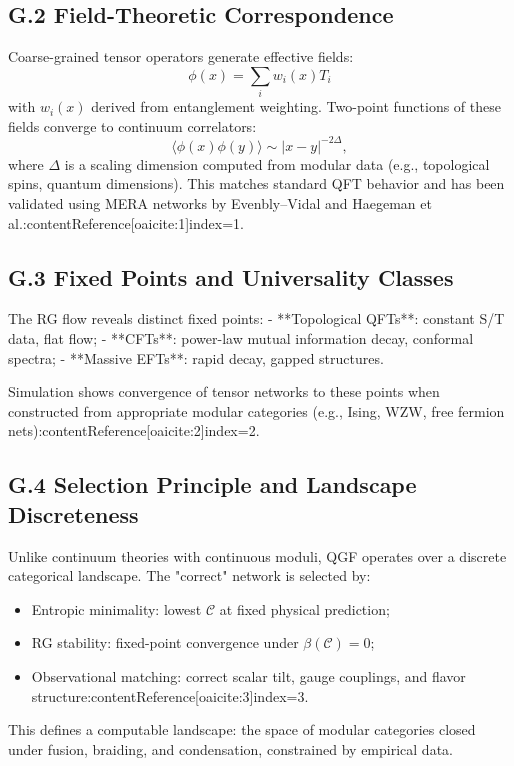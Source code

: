 \documentclass[11pt]{article}
\begin{document}
\subsection*{G.2 Field-Theoretic Correspondence}

Coarse-grained tensor operators generate effective fields:
\[
\phi(x) = \sum_i w_i(x) T_i
\]
with \( w_i(x) \) derived from entanglement weighting. Two-point functions of these fields converge to continuum correlators:
\[
\langle \phi(x) \phi(y) \rangle \sim |x - y|^{-2\Delta},
\]
where \( \Delta \) is a scaling dimension computed from modular data (e.g., topological spins, quantum dimensions). This matches standard QFT behavior and has been validated using MERA networks by Evenbly–Vidal and Haegeman et al.:contentReference[oaicite:1]{index=1}.

\subsection*{G.3 Fixed Points and Universality Classes}

The RG flow reveals distinct fixed points:
- **Topological QFTs**: constant S/T data, flat flow;
- **CFTs**: power-law mutual information decay, conformal spectra;
- **Massive EFTs**: rapid decay, gapped structures.

Simulation shows convergence of tensor networks to these points when constructed from appropriate modular categories (e.g., Ising, WZW, free fermion nets):contentReference[oaicite:2]{index=2}.

\subsection*{G.4 Selection Principle and Landscape Discreteness}

Unlike continuum theories with continuous moduli, QGF operates over a discrete categorical landscape. The "correct" network is selected by:
\begin{itemize}
  \item Entropic minimality: lowest \( \mathcal{C} \) at fixed physical prediction;
  \item RG stability: fixed-point convergence under \( \beta(\mathcal{C}) = 0 \);
  \item Observational matching: correct scalar tilt, gauge couplings, and flavor structure:contentReference[oaicite:3]{index=3}.
\end{itemize}

This defines a computable landscape: the space of modular categories closed under fusion, braiding, and condensation, constrained by empirical data.
\end{document}

